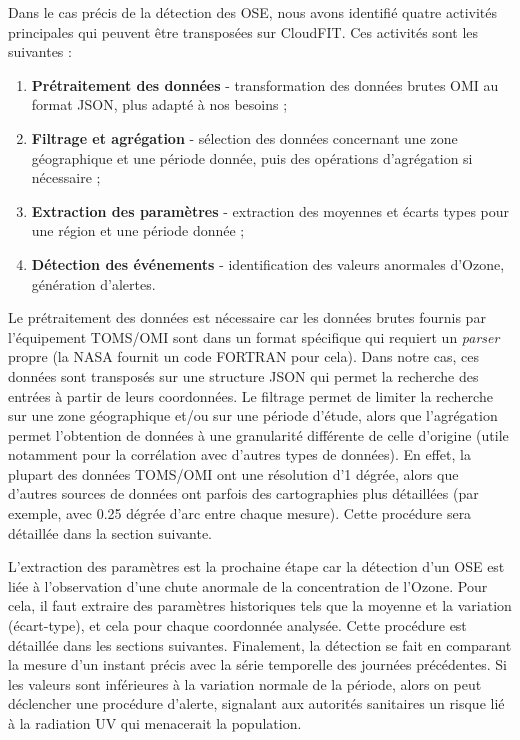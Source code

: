 Dans le cas précis de la détection des OSE, nous avons identifié quatre activités principales qui peuvent être transposées sur CloudFIT. Ces activités sont les suivantes : 
\begin{enumerate}
	\item \textbf{Prétraitement des données} - transformation des données brutes OMI au format JSON, plus adapté à nos besoins ;
	\item \textbf{Filtrage et agrégation} - sélection des données concernant une zone géographique et une période donnée, puis des opérations d'agrégation si nécessaire ;
	\item \textbf{Extraction des paramètres} - extraction des moyennes et écarts types pour une région et une période donnée ;
	\item \textbf{Détection des événements} - identification des valeurs anormales d'Ozone, génération d'alertes.
\end{enumerate}

Le prétraitement des données est nécessaire car les données brutes fournis par l'équipement TOMS/OMI sont dans un format spécifique qui requiert un \textit{parser} propre (la NASA fournit un code FORTRAN pour cela). Dans notre cas, ces données sont transposés sur une structure JSON qui permet la recherche des entrées à partir de leurs coordonnées. Le filtrage permet de limiter la recherche sur une zone géographique et/ou sur une période d'étude, alors que l'agrégation permet l'obtention de données à une granularité différente de celle d'origine (utile notamment pour la corrélation avec d'autres types de données). En effet, la plupart des données TOMS/OMI ont une résolution d'1 dégrée, alors que d'autres sources de données ont parfois des cartographies plus détaillées (par exemple, avec 0.25 dégrée d'arc entre chaque mesure). Cette procédure sera détaillée dans la section suivante.

L'extraction des paramètres est la prochaine étape car la détection d'un OSE est liée à l'observation d'une chute anormale de la concentration de l'Ozone. Pour cela, il faut extraire des paramètres historiques tels que la moyenne et la variation (écart-type), et cela pour chaque coordonnée analysée. Cette procédure est  détaillée dans les sections suivantes. Finalement, la détection se fait en comparant la mesure d'un instant précis avec la série temporelle des journées précédentes. Si les valeurs sont inférieures à la variation normale de la période, alors on peut déclencher une procédure d'alerte, signalant aux autorités sanitaires un risque lié à la radiation UV qui menacerait la population.

